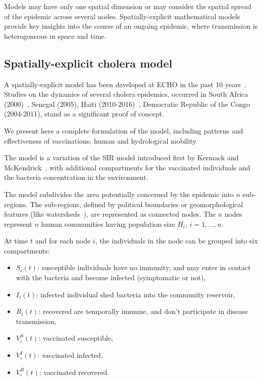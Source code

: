 Models may have only one spatial dimension or may consider the spatial spread of the epidemic across several nodes. Spatially-explicit mathematical models provide key insights into the course of an ongoing epidemic, where transmission is heterogeneous in space and time.

\subsection{Spatially-explicit cholera model}
A spatially-explicit model has been developed at ECHO in the past 10 years~\cite{bertuzzo_space-time_2008}. Studies on the dynamics of several cholera epidemics, occurred in South Africa (2000)~\cite{mari_modelling_2012}, Senegal (2005), Haiti (2010-2016)~\cite{bertuzzo_prediction_2011}, Democratic Republic of the Congo  (2004-2011), stand as a significant proof of concept.  %

We present here a complete formulation of the model, including patterns and effectiveness of vaccinations, human and hydrological mobility~\cite{bertuzzo_probability_2016,pasetto_real-time_2017}

The model is a variation of the SIR model introduced first by Kermack and McKendrick~\cite{kermack_contribution_1927}, with additional compartments for the vaccinated individuals and the bacteria concentration in the environment.

The model subdivides the area potentially concerned by the epidemic into $n$ sub-regions. The sub-regions, defined by political boundaries or geomorphological features (like watersheds~\cite{bertuzzo_probability_2016}), are represented as connected nodes. The $n$ nodes represent $n$ human communities having population size $H_i$, $i=1,\dots, n$. 

At time $t$ and for each node $i$, the individuals in the node can be grouped into six compartments:

\begin{itemize}
\item $S_i(t)$: susceptible individuals  have no immunity, and may enter in contact with the bacteria and become infected (symptomatic or not),
\item $I_i(t)$: infected individual shed bacteria into the community reservoir,
\item $R_i(t)$: recovered are temporally immune, and don't participate in disease transmission,
\item $V^S_i(t)$: vaccinated susceptible,
\item $V^I_i(t)$: vaccinated infected,
\item $V^R_i(t)$: vaccinated recovered.
\end{itemize}

